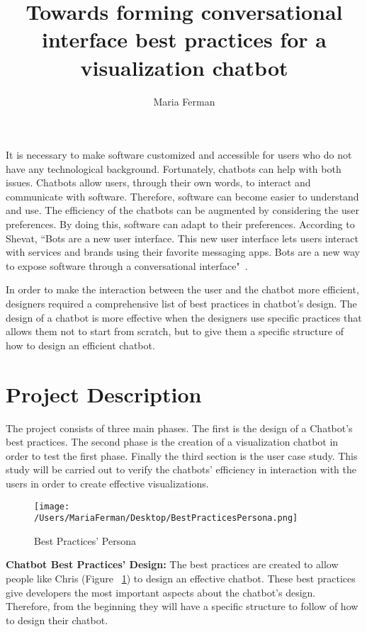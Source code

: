 \documentclass[a4paper,10pt]{article}
\title{Towards forming conversational interface best practices for a visualization chatbot}
\author{Maria Ferman}
\begin{document}
\maketitle
It is necessary to make software customized and accessible for users who do not have any technological background. Fortunately, chatbots can help with both issues. Chatbots allow users, through their own words, to interact and communicate with software. Therefore, software can become easier to understand and use. The efficiency of the chatbots can be augmented by considering the user preferences. By doing this, software can adapt to their preferences. According to Shevat,  ``Bots are a new user interface. This new user interface lets users interact with services and brands using their favorite messaging apps. Bots are a new way to expose software through a conversational interface"~\cite{Shevat2017}. 

In order to make the interaction between the user and the chatbot more efficient, designers required a comprehensive list of best practices in chatbot's design. 
The design of a chatbot is more effective when the designers use specific practices that allows them not to start from scratch, but to give them a specific structure of how to design an efficient chatbot. 

\section*{Project Description}

The project consists of three main phases. The first is the design of a Chatbot's best practices. The second phase is the creation of a visualization chatbot in order to test the first phase. Finally the third section is the user case study. This study will be carried out to verify the chatbots' efficiency in interaction with the users in order to create effective visualizations.

\begin{figure}
\centering
\texttt{[image: /Users/MariaFerman/Desktop/BestPracticesPersona.png]}
\caption{Best Practices' Persona}
\label{FigureChris}
\end{figure}

\textbf{Chatbot Best Practices' Design:} The best practices are created to allow people like Chris (Figure ~\ref{FigureChris}) to design an effective chatbot. These best practices give developers the most important aspects about the chatbot's design. Therefore, from the beginning they will have a specific structure to follow of how to design  their chatbot.
\end{document}
